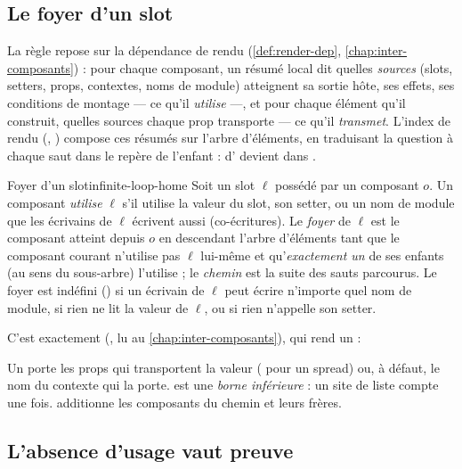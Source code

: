 \subsection{Le foyer d'un slot}

La règle repose sur la dépendance de rendu (\cref{def:render-dep}, \cref{chap:inter-composants}) : pour chaque composant, un résumé local dit quelles \emph{sources} (slots, setters, props, contextes, noms de module) atteignent sa sortie hôte, ses effets, ses conditions de montage --- ce qu'il \emph{utilise} ---, et pour chaque élément qu'il construit, quelles sources chaque prop transporte --- ce qu'il \emph{transmet}. L'index de rendu (, ) compose ces résumés sur l'arbre d'éléments, en traduisant la question à chaque saut dans le repère de l'enfant :  d' devient  dans .

\begin{definition}{Foyer d'un slot}{infinite-loop-home}
Soit un slot $\ell$ possédé par un composant $o$. Un composant \emph{utilise} $\ell$ s'il utilise la valeur du slot, son setter, ou un nom de module que les écrivains de $\ell$ écrivent aussi (\og co-écritures\fg). Le \emph{foyer} de $\ell$ est le composant atteint depuis $o$ en descendant l'arbre d'éléments tant que le composant courant n'utilise pas $\ell$ lui-même et qu'\emph{exactement un} de ses enfants (au sens du sous-arbre) l'utilise ; le \emph{chemin} est la suite des sauts parcourus. Le foyer est indéfini () si un écrivain de $\ell$ peut écrire n'importe quel nom de module, si rien ne lit la valeur de $\ell$, ou si rien n'appelle son setter.
\end{definition}

C'est exactement  (, lu au \cref{chap:inter-composants}), qui rend un  :


Un  porte les props qui transportent la valeur ( pour un spread) ou, à défaut, le nom du contexte qui la porte.  est une \emph{borne inférieure} : un site de liste compte une fois.  additionne les composants du chemin et leurs frères.

\subsection{L'absence d'usage vaut preuve}

